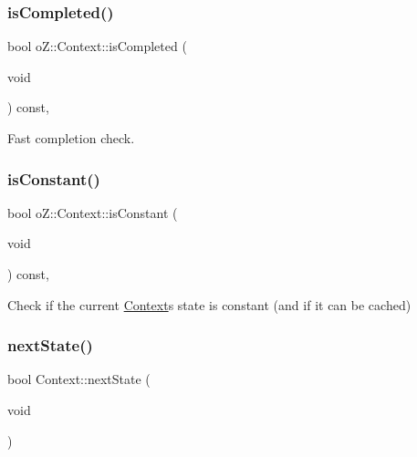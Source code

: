 \mbox{\label{classo_z_1_1_context_ac5dd957a1f76f466b86a179ed3146967}} 
\subsubsection{\texorpdfstring{isCompleted()}{isCompleted()}}
{\footnotesize\ttfamily bool o\+Z\+::\+Context\+::is\+Completed (\begin{DoxyParamCaption}\item[{void}]{ }\end{DoxyParamCaption}) const\hspace{0.3cm}{\ttfamily [inline]}, {\ttfamily [noexcept]}}



Fast completion check. 

\mbox{\label{classo_z_1_1_context_a748147258019436983fdbbf6ed51c0b6}} 
\subsubsection{\texorpdfstring{isConstant()}{isConstant()}}
{\footnotesize\ttfamily bool o\+Z\+::\+Context\+::is\+Constant (\begin{DoxyParamCaption}\item[{void}]{ }\end{DoxyParamCaption}) const\hspace{0.3cm}{\ttfamily [inline]}, {\ttfamily [noexcept]}}



Check if the current \mbox{\hyperlink{classo_z_1_1_context}{Context}}\textquotesingle{}s state is constant (and if it can be cached) 

\mbox{\label{classo_z_1_1_context_aa07d51de7059b3a4fc9e3505704a33be}} 
\subsubsection{\texorpdfstring{nextState()}{nextState()}}
{\footnotesize\ttfamily bool Context\+::next\+State (\begin{DoxyParamCaption}\item[{void}]{ }\end{DoxyParamCaption})\hspace{0.3cm}{\ttfamily [noexcept]}}



